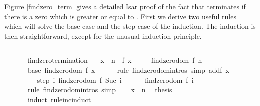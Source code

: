 \begin{isabellebody}
\begin{isamarkuptext}
  Figure \ref{findzero_term} gives a detailed Isar proof of the fact
  that  terminates if there is a zero which is greater
  or equal to . First we derive two useful rules which will
  solve the base case and the step case of the induction. The
  induction is then straightforward, except for the unusual induction
  principle.%
\end{isamarkuptext}%
\isamarkuptrue%
%
\begin{figure}
\hrule\vspace{6pt}
\begin{minipage}{0.8\textwidth}
\isastyle\isamarkuptrue
{}\isamarkupfalse%
\ findzero{\isacharunderscore}termination{\isacharcolon}\isanewline
\ \ \ {\isachardoublequoteopen}x\ {\isasymge}\ n{\isachardoublequoteclose}\ \ {\isachardoublequoteopen}f\ x\ {\isacharequal}\ {}{\isachardoublequoteclose}\isanewline
\ \ \ {\isachardoublequoteopen}findzero{\isacharunderscore}dom\ {\isacharparenleft}f{\isacharcomma}\ n{\isacharparenright}{\isachardoublequoteclose}\isanewline
%
\isadelimproof
%
\endisadelimproof
%
\isatagproof
{}\isamarkupfalse%
\ {\isacharminus}\ \isanewline
\ \ \isamarkupfalse%
\ base{\isacharcolon}\ {\isachardoublequoteopen}findzero{\isacharunderscore}dom\ {\isacharparenleft}f{\isacharcomma}\ x{\isacharparenright}{\isachardoublequoteclose}\isanewline
\ \ \ \ \isamarkupfalse%
\ {\isacharparenleft}rule\ findzero{\isachardot}domintros{\isacharparenright}\ {\isacharparenleft}simp\ add{\isacharcolon}{\isacharbackquoteopen}f\ x\ {\isacharequal}\ {}{\isacharbackquoteclose}{\isacharparenright}\isanewline
\isanewline
\ \ \isamarkupfalse%
\ step{\isacharcolon}\ {\isachardoublequoteopen}{\isasymAnd}i{\isachardot}\ findzero{\isacharunderscore}dom\ {\isacharparenleft}f{\isacharcomma}\ Suc\ i{\isacharparenright}\ \isanewline
\ \ \ \ {\isasymLongrightarrow}\ findzero{\isacharunderscore}dom\ {\isacharparenleft}f{\isacharcomma}\ i{\isacharparenright}{\isachardoublequoteclose}\isanewline
\ \ \ \ \isamarkupfalse%
\ {\isacharparenleft}rule\ findzero{\isachardot}domintros{\isacharparenright}\ simp\isanewline
\isanewline
\ \ \isamarkupfalse%
\ {\isacharbackquoteopen}x\ {\isasymge}\ n{\isacharbackquoteclose}\ \isamarkupfalse%
\ {\isacharquery}thesis\isanewline
\ \ \isamarkupfalse%
\ {\isacharparenleft}induct\ rule{\isacharcolon}inc{\isacharunderscore}induct{\isacharparenright}\isanewline

\end{minipage}
\end{figure}
\end{isabellebody}
